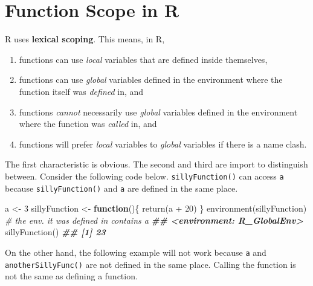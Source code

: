 \documentclass[
  12pt,
  krantz2]{krantz}
\makeatletter
\newenvironment{Shaded}{\begin{snugshade}}{\end{snugshade}}
\newcommand{\CommentTok}[1]{\textcolor[rgb]{0.37,0.37,0.37}{\textit{#1}}}
\newcommand{\ControlFlowTok}[1]{\textcolor[rgb]{0.27,0.27,0.27}{\textbf{#1}}}
\newcommand{\DecValTok}[1]{\textcolor[rgb]{0.06,0.06,0.06}{#1}}
\newcommand{\DocumentationTok}[1]{\textcolor[rgb]{0.37,0.37,0.37}{\textbf{\textit{#1}}}}
\newcommand{\FunctionTok}[1]{\textcolor[rgb]{0,0,0}{#1}}
\newcommand{\NormalTok}[1]{#1}
\newcommand{\OtherTok}[1]{\textcolor[rgb]{0.37,0.37,0.37}{#1}}
\newcommand{\SpecialCharTok}[1]{\textcolor[rgb]{0,0,0}{#1}}
\providecommand{\tightlist}{%
  \setlength{\itemsep}{0pt}\setlength{\parskip}{0pt}}
\newenvironment{kframe}{%
\medskip{}
\setlength{\fboxsep}{.8em}
 \def\at@end@of@kframe{}%
 \ifinner\ifhmode%
  \def\at@end@of@kframe{\end{minipage}}%
  \begin{minipage}{\columnwidth}%
 \fi\fi%
 \def\FrameCommand##1{\hskip\@totalleftmargin \hskip-\fboxsep
 \colorbox{shadecolor}{##1}\hskip-\fboxsep
     \hskip-\linewidth \hskip-\@totalleftmargin \hskip\columnwidth}%
 \MakeFramed {\advance\hsize-\width
   \@totalleftmargin\z@ \linewidth\hsize
   \@setminipage}}%
 {\par\unskip\endMakeFramed%
 \at@end@of@kframe}
\renewenvironment{Shaded}{\begin{kframe}}{\end{kframe}}
\makeatother
\begin{document}
\hypertarget{function-scope-in-r}{%
\section{Function Scope in R}\label{function-scope-in-r}}

R uses \textbf{lexical scoping}. This means, in R,

\begin{enumerate}
\def\labelenumi{\arabic{enumi}.}
\tightlist
\item
  functions can use \emph{local} variables that are defined inside themselves,\\
\item
  functions can use \emph{global} variables defined in the environment where the function itself was \emph{defined} in, and
\item
  functions \emph{cannot} necessarily use \emph{global} variables defined in the environment where the function was \emph{called} in, and
\item
  functions will prefer \emph{local} variables to \emph{global} variables if there is a name clash.
\end{enumerate}

The first characteristic is obvious. The second and third are import to distinguish between. Consider the following code below. \texttt{sillyFunction()} can access \texttt{a} because \texttt{sillyFunction()} and \texttt{a} are defined in the same place.

\begin{Shaded}
\begin{Highlighting}[]
\NormalTok{a }\OtherTok{\textless{}{-}} \DecValTok{3}
\NormalTok{sillyFunction }\OtherTok{\textless{}{-}} \ControlFlowTok{function}\NormalTok{()\{}
  \FunctionTok{return}\NormalTok{(a }\SpecialCharTok{+} \DecValTok{20}\NormalTok{) }
\NormalTok{\}}
\FunctionTok{environment}\NormalTok{(sillyFunction) }\CommentTok{\# the env. it was defined in contains a}
\DocumentationTok{\#\# \textless{}environment: R\_GlobalEnv\textgreater{}}
\FunctionTok{sillyFunction}\NormalTok{()}
\DocumentationTok{\#\# [1] 23}
\end{Highlighting}
\end{Shaded}

On the other hand, the following example will not work because \texttt{a} and \texttt{anotherSillyFunc()} are not defined in the same place. Calling the function is not the same as defining a function.
\end{document}

